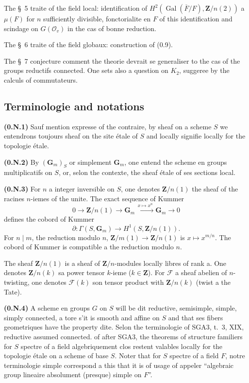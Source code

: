 \documentclass[11pt,a4paper]{article}
\theoremstyle{plain}
\theoremstyle{definition}
\DeclareMathOperator{\Gal}{Gal}
\begin{document}
The \S~5 traite of the field local: identification of $H^2(\Gal(\overline{F}/F), \mathbf{Z}/n(2))$ a $\mu(F)$ for $n$ sufficiently divisible, fonctorialite en $F$ of this identification and scindage on $G(\mathcal{O}_v)$ in the cas of bonne reduction.

The \S~6 traite of the field globaux: construction of (0.9).

The \S~7 conjecture comment the theorie devrait se generaliser to the cas of the groups reductifs connected. One sets also a question on $K_2$, suggeree by the calculs of commutateurs.

\subsection*{Terminologie and notations}

\textbf{(0.N.1)} Sauf mention expresse of the contraire, by sheaf on a scheme $S$ we entendrons toujours sheaf on the site étale of $S$ and locally signifie locally for the topologie étale.

\textbf{(0.N.2)} By $(\mathbf{G}_m)_S$ or simplement $\mathbf{G}_m$, one entend the scheme en groups multiplicatifs on $S$, or, selon the contexte, the sheaf étale of ses sections local.

\textbf{(0.N.3)} For $n$ a integer inversible on $S$, one denotes $\mathbf{Z}/n(1)$ the sheaf of the racines $n$-iemes of the unite. The exact sequence of Kummer
\[
0 \to \mathbf{Z}/n(1) \to \mathbf{G}_m \xrightarrow{\,x \mapsto x^n\,} \mathbf{G}_m \to 0
\]
defines the cobord of Kummer
\[
\partial : \Gamma(S, \mathbf{G}_m) \to H^1(S, \mathbf{Z}/n(1)).
\]
For $n \mid m$, the reduction modulo $n$, $\mathbf{Z}/m(1) \to \mathbf{Z}/n(1)$ is $x \mapsto x^{m/n}$. The cobord of Kummer is compatible a the reduction modulo $n$.

The sheaf $\mathbf{Z}/n(1)$ is a sheaf of $\mathbf{Z}/n$-modules locally libres of rank a. One denotes $\mathbf{Z}/n(k)$ sa power tensor $k$-ieme ($k \in \mathbf{Z}$). For $\mathscr{F}$ a sheaf abelien of $n$-twisting, one denotes $\mathscr{F}(k)$ son tensor product with $\mathbf{Z}/n(k)$ (twist a the Tate).

\textbf{(0.N.4)} A scheme en groups $G$ on $S$ will be dit reductive, semisimple, simple, simply connected, a tore s'it is smooth and affine on $S$ and that ses fibers geometriques have the property dite. Selon the terminologie of SGA3, t.~3, XIX, reductive assumed connected. of after SGA3, the theorems of structure familiers for $S$ spectre of a field algebriquement clos restent valables locally for the topologie étale on a scheme of base $S$. Noter that for $S$ spectre of a field $F$, notre terminologie simple correspond a this that it is of usage of appeler ``algebraic group lineaire absolument (presque) simple on $F$''.
\end{document}

